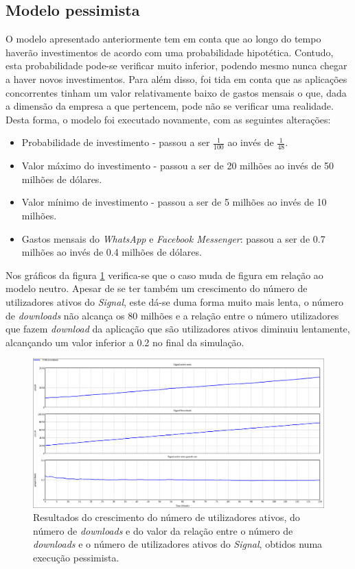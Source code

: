 \subsection{Modelo pessimista}

O modelo apresentado anteriormente tem em conta que ao longo do tempo haverão investimentos de acordo com uma probabilidade hipotética. Contudo, esta probabilidade pode-se verificar muito inferior, podendo mesmo nunca chegar a haver novos investimentos. Para além disso, foi tida em conta que as aplicações concorrentes tinham um valor relativamente baixo de gastos mensais o que, dada a dimensão da empresa a que pertencem, pode não se verificar uma realidade. Desta forma, o modelo foi executado novamente, com as seguintes alterações:

\begin{itemize}
   \item Probabilidade de investimento - passou a ser $\frac{1}{100}$ ao invés de $\frac{1}{48}$.
   \item Valor máximo do investimento - passou a ser de 20 milhões ao invés de 50 milhões de dólares.
   \item Valor mínimo de investimento - passou a ser de 5 milhões ao invés de 10 milhões.
   \item Gastos mensais do \textit{WhatsApp} e \textit{Facebook Messenger}: passou a ser de 0.7 milhões ao invés de 0.4 milhões de dólares.
\end{itemize}

Nos gráficos da figura \ref{model:pessimist_signal_model} verifica-se que o caso muda de figura em relação ao modelo neutro. Apesar de se ter também um crescimento do número de utilizadores ativos do \textit{Signal}, este dá-se duma forma muito mais lenta, o número de \textit{downloads} não alcança os 80 milhões e a relação entre o número utilizadores que fazem \textit{download} da aplicação que são utilizadores ativos diminuiu lentamente, alcançando um valor inferior a 0.2 no final da simulação.

\begin{figure}[H]
   \begin{center}
       \includegraphics[width=17cm]{img/pessimist_model_signal.png}
       \caption{Resultados do crescimento do número de utilizadores ativos, do número de \textit{downloads} e do valor da relação entre o número de \textit{downloads} e o número de utilizadores ativos do \textit{Signal}, obtidos numa execução pessimista.}
       \label{model:pessimist_signal_model}
   \end{center}
\end{figure}

